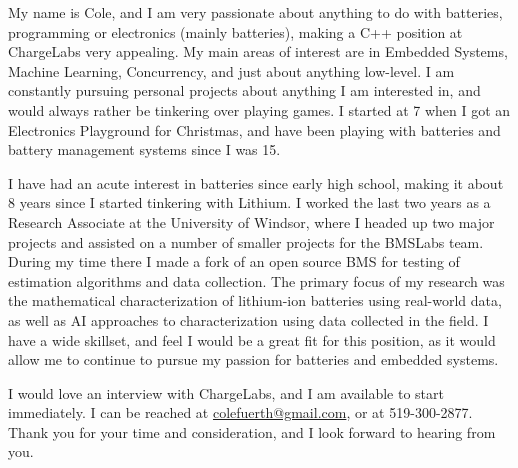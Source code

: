 
My name is Cole, and I am very passionate about anything to do with batteries, programming or electronics (mainly batteries), making a C++ position at ChargeLabs very appealing. My main areas of interest are in Embedded Systems, Machine Learning, Concurrency, and just about anything low-level. I am constantly pursuing personal projects about anything I am interested in, and would always rather be tinkering over playing games. I started at 7 when I got an Electronics Playground for Christmas, and have been playing with batteries and battery management systems since I was 15.

I have had an acute interest in batteries since early high school, making it about 8 years since I started tinkering with Lithium. I worked the last two years as a Research Associate at the University of Windsor, where I headed up two major projects and assisted on a number of smaller projects for the BMSLabs team. During my time there I made a fork of an open source BMS for testing of estimation algorithms and data collection. The primary focus of my research was the mathematical characterization of lithium-ion batteries using real-world data, as well as AI approaches to characterization using data collected in the field. I have a wide skillset, and feel I would be a great fit for this position, as it would allow me to continue to pursue my passion for batteries and embedded systems.

I would love an interview with ChargeLabs, and I am available to start immediately. I can be reached at \href{mailto:colefuerth@gmail.com}{colefuerth@gmail.com}, or at 519-300-2877. Thank you for your time and consideration, and I look forward to hearing from you.